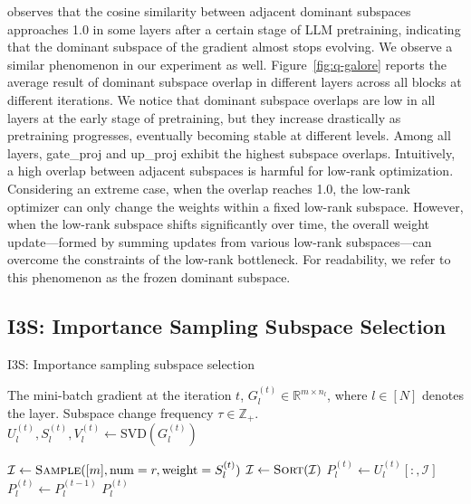 \cite{zhang2024q-galore} observes that the cosine similarity between adjacent dominant subspaces approaches 1.0 in some layers after a certain stage of LLM pretraining, indicating that the dominant subspace of the gradient almost stops evolving. We observe a similar phenomenon in our experiment as well. Figure~\ref{fig:q-galore} reports the average result of dominant subspace overlap in different layers across all blocks at different iterations. We notice that dominant subspace overlaps are low in all layers at the early stage of pretraining, but they increase drastically as pretraining progresses, eventually becoming stable at different levels. Among all layers, gate\_proj and up\_proj exhibit the highest subspace overlaps. Intuitively, a high overlap between adjacent subspaces is harmful for low-rank optimization. Considering an extreme case, when the overlap reaches 1.0, the low-rank optimizer can only change the weights within a fixed low-rank subspace. However, when the low-rank subspace shifts significantly over time, the overall weight update—formed by summing updates from various low-rank subspaces—can overcome the constraints of the low-rank bottleneck. For readability, we refer to this phenomenon as the frozen dominant subspace.

\subsection{I3S: Importance Sampling Subspace Selection}

\begin{algorithm}[!ht]
   \caption{I3S: Importance sampling subspace selection}
   \label{alg:imp_sampling}
 \begin{algorithmic}[1]
     The mini-batch gradient at the iteration $t$, $G_l^{(t)} \in \mathbb{R}^{m \times n_l}$, where $l \in [N]$ denotes the layer. Subspace change frequency $\tau \in \mathbb{Z}_+$.\\
   \STATE $U_l^{(t)}, S_l^{(t)}, V_l^{(t)} \gets \text{SVD}(G_l^{(t)})$
   
   \STATE $\mathcal{I} \gets \textsc{Sample}([m], \mathrm{num}=r, \mathrm{weight}=S_l^{(t)})$ 
   \STATE $\mathcal{I} \gets \textsc{Sort}(\mathcal{I})$
   \STATE $P_l^{(t)} \gets U_l^{(t)}[:,\mathcal{I}]$ 
   \ELSE
   \STATE $P_l^{(t)} \gets P_l^{(t-1)}$ \hfill {}
   \ENDIF
    $P_l^{(t)}$
 \end{algorithmic}
\end{algorithm}



